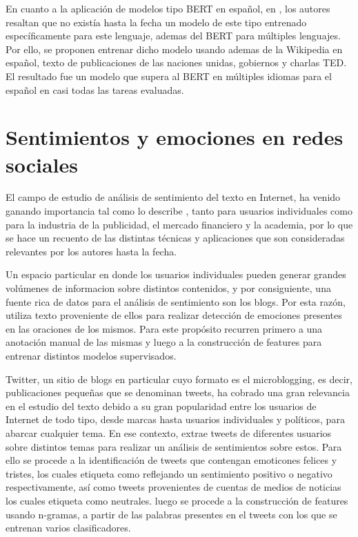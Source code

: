 En cuanto a la aplicación de modelos tipo BERT en español, en \cite{canete2020spanish}, los autores resaltan que no existía hasta la fecha un modelo de este tipo entrenado específicamente para este lenguaje, ademas del BERT para múltiples lenguajes. Por ello, se proponen entrenar dicho modelo usando ademas de la Wikipedia en español, texto de publicaciones de las naciones unidas, gobiernos y charlas TED. El resultado fue un modelo que supera al BERT en múltiples idiomas para el español en casi todas las tareas evaluadas.



\section{Sentimientos y emociones en redes sociales}

El campo de estudio de análisis de sentimiento del texto en Internet, ha venido ganando importancia tal como lo describe \cite{pang2008opinion} , tanto para usuarios individuales como para la industria de la publicidad, el mercado financiero y la academia, por lo que se hace un recuento de las distintas técnicas y aplicaciones que son consideradas relevantes por los autores hasta la fecha.

Un espacio particular en donde los usuarios individuales pueden generar grandes volúmenes de informacion sobre distintos contenidos, y por consiguiente, una fuente rica de datos para el análisis de sentimiento son los blogs. Por esta razón, \cite{aman2007identifying} utiliza texto proveniente de ellos para realizar detección de emociones presentes en las oraciones de los mismos. Para este propósito recurren primero a una anotación manual de las mismas y luego a la construcción de features para entrenar distintos modelos supervisados. 

Twitter, un sitio de blogs en particular cuyo formato es el microblogging, es decir, publicaciones pequeñas que se denominan tweets, ha cobrado una gran relevancia en el estudio del texto debido a su gran popularidad entre los usuarios de Internet de todo tipo, desde marcas hasta usuarios individuales y políticos, para abarcar cualquier tema. En ese contexto,  \cite{pak2010twitter} extrae tweets de diferentes usuarios sobre distintos temas para realizar un análisis de sentimientos sobre estos. Para ello se procede  a la identificación de tweets que contengan emoticones felices y tristes, los cuales etiqueta como reflejando un sentimiento positivo o negativo respectivamente, así como tweets provenientes de cuentas de medios de noticias los cuales etiqueta como neutrales. luego se procede a la construcción de features usando n-gramas, a partir de las palabras presentes en el tweets  con los que se entrenan varios clasificadores. 


